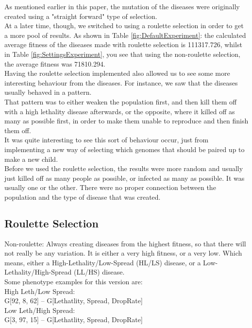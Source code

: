 \documentclass[conference,compsoc]{IEEEtran}
\begin{document}
As mentioned earlier in this paper, the mutation of the diseases were originally created using a "straight forward" type of selection.\\
At a later time, though, we switched to using a roulette selection in order to get a more pool of results. As shown in Table \ref{fig:DefaultExperiment}: the calculated average fitness of the diseases made with roulette selection is 111317.726, whilst in Table \ref{fig:SettingsExperiment}, you see that using the non-roulette selection, the average fitness was 71810.294.\\
Having the roulette selection implemented also allowed us to see some more interesting behaviour from the diseases. For instance, we saw that the diseases usually behaved in a pattern.\\
That pattern was to either weaken the population first, and then kill them off with a high lethality disease afterwards, or the opposite, where it killed off as many as possible first, in order to make them unable to reproduce and then finish them off.\\

It was quite interesting to see this sort of behaviour occur, just from implementing a new way of selecting which genomes that should be paired up to make a new child.\\ 
Before we used the roulette selection, the results were more random and usually just killed off as many people as possible, or infected as many as possible. It was usually one or the other. There were no proper connection between the population and the type of disease that was created.\\

\subsection{Roulette Selection}
Non-roulette: Always creating diseases from the highest fitness, so that there will not really be any variation. It is either a very high fitness, or a very low. Which means, either a High-Lethality/Low-Spread (HL/LS) disease, or a Low-Lethality/High-Spread (LL/HS) disease.\\
Some phenotype examples for this version are:\\
High Leth/Low Spread:\\ 
G[92, 8, 62] -- G[Lethatlity, Spread, DropRate]\\
Low Leth/High Spread:\\ 
G[3, 97, 15] -- G[Lethatlity, Spread, DropRate]\\
\end{document}
